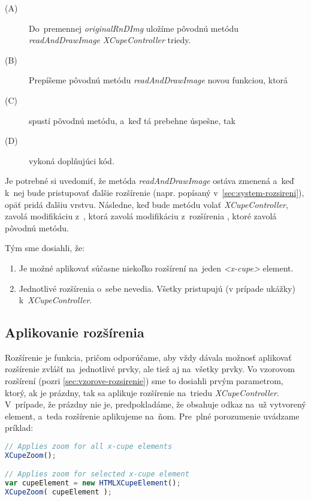 \begin{description}
	\item [(A)] Do~premennej \emph{originalRnDImg} uložíme pôvodnú metódu \emph{readAndDrawImage} \emph{XCupeController} triedy. 
	\item [(B)] Prepíšeme pôvodnú metódu \emph{readAndDrawImage} novou funkciou, ktorá
	\item [(C)] spustí pôvodnú metódu, a~keď tá prebehne úspešne, tak
	\item [(D)] vykoná doplňujúci kód.
\end{description}

Je potrebné si uvedomiť, že metóda \emph{readAndDrawImage} ostáva zmenená a~keď k~nej bude pristupovať ďalšie rozšírenie (napr.  popísaný v~\ref{sec:system-rozsireni}), opäť pridá ďalšiu vrstvu. Následne, keď bude metódu volať \emph{XCupeController}, zavolá modifikáciu z~, ktorá zavolá modifikáciu z~rozšírenia , ktoré zavolá pôvodnú metódu.


Tým sme dosiahli, že:

\begin{enumerate}
	\item Je možné aplikovať súčasne niekoľko rozšírení na~jeden \emph{<x-cupe>} element.
	\item Jednotlivé rozšírenia o~sebe nevedia. Všetky pristupujú (v prípade ukážky) k~\emph{XCupeController}. 
\end{enumerate}


\subsection{Aplikovanie rozšírenia}

Rozšírenie je funkcia, pričom odporúčame, aby vždy dávala možnosť aplikovať rozšírenie zvlášť na~jednotlivé prvky, ale tiež aj na~všetky prvky. Vo vzorovom rozšírení  (pozri \ref{sec:vzorove-rozsirenie}) sme to dosiahli prvým parametrom, ktorý, ak je prázdny, tak sa aplikuje rozšírenie na~triedu \emph{XCupeController}. V~prípade, že prázdny nie je, predpokladáme, že obsahuje odkaz na~už vytvorený element, a~teda rozšírenie aplikujeme na~ňom. Pre~plné porozumenie uvádzame príklad:

\begin{lstlisting}[language=JavaScript]
// Applies zoom for all x-cupe elements
XCupeZoom();

// Applies zoom for selected x-cupe element
var cupeElement = new HTMLXCupeElement();
XCupeZoom( cupeElement );
\end{lstlisting}


